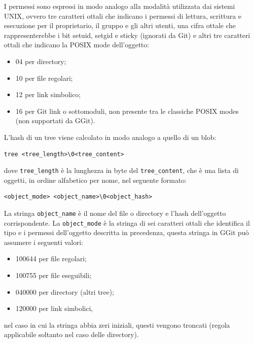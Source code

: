 I permessi sono espressi in modo analogo alla modalità utilizzata dai sistemi UNIX, ovvero tre caratteri ottali che indicano i permessi di lettura, scrittura e esecuzione per il proprietario, il gruppo e gli altri utenti, una cifra ottale che rappresenterebbe i bit setuid, setgid e sticky (ignorati da Git) e altri tre caratteri ottali che indicano la POSIX mode\cite{gitmodes} dell'oggetto:
\begin{itemize}
    \item 04 per directory;
    \item 10 per file regolari;
    \item 12 per link simbolico;
    \item 16 per Git link o sottomoduli, non presente tra le classiche POSIX modes (non supportati da GGit).
\end{itemize}
L'hash di un tree viene calcolato in modo analogo a quello di un blob:
\begin{verbatim}
tree <tree_length>\0<tree_content>
\end{verbatim}
dove \texttt{tree\_length} è la lunghezza in byte del \texttt{tree\_content}, che è una lista di oggetti, in ordine alfabetico per nome, nel seguente formato:
\begin{verbatim}
<object_mode> <object_name>\0<object_hash>
\end{verbatim}
La stringa \texttt{object\_name} è il nome del file o directory e  l'hash dell'oggetto corrispondente.
La \texttt{object\_mode} è la stringa di sei caratteri ottali che identifica il tipo e i permessi dell'oggetto descritta in precedenza, questa stringa in GGit può assumere i seguenti valori:
\begin{itemize}
    \item 100644 per file regolari;
    \item 100755 per file eseguibili;
    \item 040000 per directory (altri tree);
    \item 120000 per link simbolici,
\end{itemize}
nel caso in cui la stringa abbia zeri iniziali, questi vengono troncati (regola applicabile soltanto nel caso delle directory).
